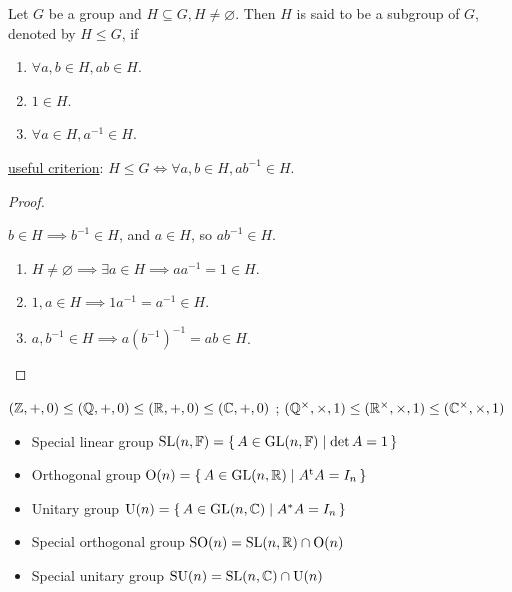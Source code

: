 \begin{definition}
  Let $G$ be a group and $H \subseteq G, H \ne \varnothing$.
  Then $H$ is said to be a subgroup of $G$, denoted by $H \le G$, if
  \begin{enumerate}
    \item $\forall a, b \in H, ab \in H$.
    \item $1 \in H$.
    \item $\forall a \in H, a^{-1} \in H$.
  \end{enumerate}
  \underline{useful criterion}:
  $H \le G \iff \forall a, b \in H, ab^{-1} \in H$.
  \begin{proof} \mbox{}
    \begin{description}[style=nextline]
      \item[$\Rightarrow$] $b \in H \implies b^{-1} \in H$, and $a \in H$, so
        $a b^{-1} \in H$.
      \item[$\Leftarrow$]
        \begin{enumerate}
          \item $H \ne \varnothing \implies \exists a \in H \implies
            aa^{-1} = 1 \in H$.
          \item $1, a \in H \implies 1 a^{-1} = a^{-1} \in H$.
          \item $a, b^{-1} \in H \implies a (b^{-1})^{-1} = ab \in H$.
            \qedhere
        \end{enumerate}
    \end{description}
  \end{proof}
\end{definition}

\begin{example}
  $(\mathbb{Z}, +, 0) \le (\mathbb{Q}, +, 0) \le (\mathbb{R}, +, 0) \le (\mathbb{C}, +, 0)$ ;
  $(\mathbb{Q}^\times, \times, 1) \le (\mathbb{R}^\times, \times, 1) \le (\mathbb{C}^\times, \times, 1)$
\end{example}

\begin{example} \mbox{}
  \begin{itemize}
    \item Special linear group $\text{SL}(n, \mathbb{F}) = \{\, A \in
      \text{GL}(n, \mathbb{F}) \mid \det A = 1 \,\}$
    \item Orthogonal group $\text{O}(n) = \{\, A \in \text{GL}(n, \mathbb{R})
      \mid {A}^\mathrm{t} A = I_n \,\}$
    \item Unitary group $\text{U}(n) = \{\, A \in \text{GL}(n, \mathbb{C}) \mid
      A^* A = I_n \,\}$
    \item Special orthogonal group $\text{SO}(n) = \text{SL}(n, \mathbb{R}) \cap
      \text{O}(n)$
    \item Special unitary group $\text{SU}(n) = \text{SL}(n, \mathbb{C}) \cap
      \text{U}(n)$
  \end{itemize}
\end{example}

